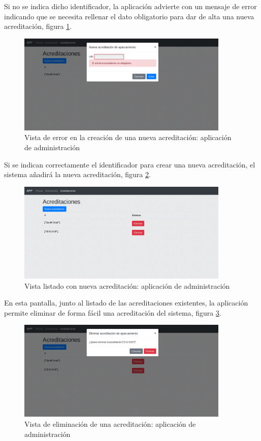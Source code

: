 Si no se indica dicho identificador, la aplicación advierte con un mensaje de error indicando que se necesita rellenar el dato obligatorio para dar de alta una nueva acreditación, figura \ref{administracion_acreditaciones_nueva_error}.
\begin{figure}[H]
	\centering
	\includegraphics[width=0.9\textwidth]{imagenes/administracion/acreditaciones_nueva_error.png}
	\caption{Vista de error en la creación de una nueva acreditación: aplicación de administración}
	\label{administracion_acreditaciones_nueva_error}
\end{figure}
Si se indican correctamente el identificador para crear una nueva acreditación, el sistema añadirá la nueva acreditación, figura \ref{administracion_acreditaciones_creada}.
\begin{figure}[H]
	\centering
	\includegraphics[width=0.9\textwidth]{imagenes/administracion/acreditaciones_creada.png}
	\caption{Vista listado con nueva acreditación: aplicación de administración}
	\label{administracion_acreditaciones_creada}
\end{figure}
En esta pantalla, junto al listado de las acreditaciones existentes, la aplicación permite eliminar de forma fácil una acreditación del sistema, figura \ref{administracion_acreditaciones_eliminar}.
\begin{figure}[H]
	\centering
	\includegraphics[width=0.9\textwidth]{imagenes/administracion/acreditaciones_eliminar.png}
	\caption{Vista de eliminación de una acreditación: aplicación de administración}
	\label{administracion_acreditaciones_eliminar}
\end{figure}

